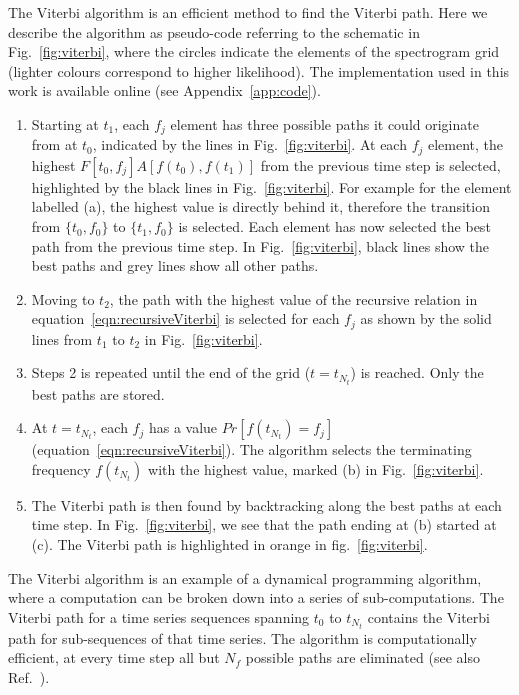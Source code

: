\documentclass[paper-main.tex]{subfiles}
\begin{document}
The Viterbi algorithm is an efficient method to find the Viterbi path. 
Here we describe the algorithm as pseudo-code referring to the schematic in Fig.~\ref{fig:viterbi}, where the circles indicate the elements of the spectrogram grid (lighter colours correspond to higher likelihood). 
The implementation used in this work is available online (see Appendix~\ref{app:code}).
\begin{enumerate}
\item Starting at $t_1$, each $f_j$ element has three possible paths it could originate from at $t_0$, indicated by the lines in Fig.~\ref{fig:viterbi}. 
At each $f_j$ element, the highest $F[t_0,f_j] A[f(t_0),f(t_1)]$ from the previous time step is selected, highlighted by the black lines in Fig.~\ref{fig:viterbi}. 
For example for the element labelled (a), the highest value is directly behind it, therefore the transition from $\{t_0,f_0\}$ to $\{t_1,f_0\}$ is selected. 
Each element has now selected the best path from the previous time step. 
In Fig.~\ref{fig:viterbi}, black lines show the best paths and grey lines show all other paths. 

\item Moving to $t_2$, the path with the highest value of the recursive relation in equation~\ref{eqn:recursiveViterbi} is selected for each $f_j$ as shown by the solid lines from $t_1$ to $t_2$ in Fig.~\ref{fig:viterbi}. 

\item Steps 2 is repeated until the end of the grid ($t=t_{N_t}$) is reached. 
Only the best paths are stored. 

\item At $t=t_{N_t}$, each $f_j$ has a value $Pr[f(t_{N_t})=f_j]$ (equation~\ref{eqn:recursiveViterbi}). 
The algorithm selects the terminating frequency $f(t_{N_t})$ with the highest value, marked (b) in Fig.~\ref{fig:viterbi}.

\item The Viterbi path is then found by backtracking along the best paths at each time step.
In Fig.~\ref{fig:viterbi}, we see that the path ending at (b) started at (c). 
The Viterbi path is highlighted in orange in fig.~\ref{fig:viterbi}.
\end{enumerate}
The Viterbi algorithm is an example of a dynamical programming algorithm, where a computation can be broken down into a series of sub-computations.
The Viterbi path for a time series sequences spanning $t_0$ to $t_{N_t}$ contains the Viterbi path for sub-sequences of that time series. 
The algorithm is computationally efficient, at every time step all but $N_f$ possible paths are eliminated (see also Ref.~\cite{ScoX1ViterbiO1:2017}).
\end{document}

